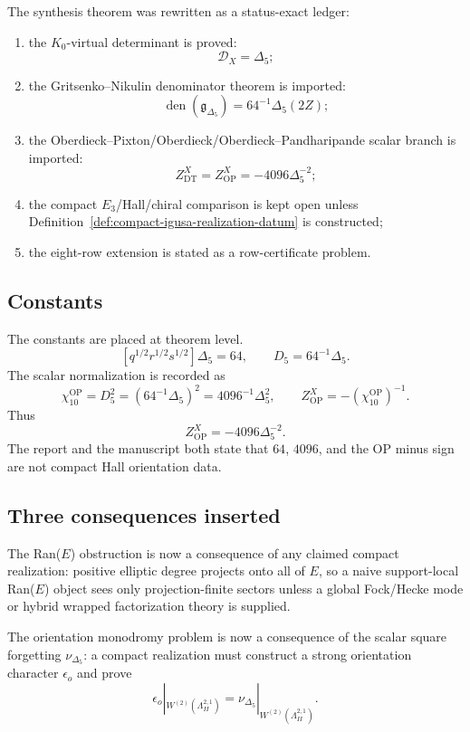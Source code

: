 The synthesis theorem was rewritten as a status-exact ledger:
\begin{enumerate}
\item the \(K_0\)-virtual determinant is proved:
\[
\mathcal D_X=\Delta_5;
\]
\item the Gritsenko--Nikulin denominator theorem is imported:
\[
\operatorname{den}(\mathfrak g_{\Delta_5})=64^{-1}\Delta_5(2Z);
\]
\item the Oberdieck--Pixton/Oberdieck/Oberdieck--Pandharipande scalar
branch is imported:
\[
Z^X_{\mathrm{DT}}=Z^X_{\mathrm{OP}}=-4096\Delta_5^{-2};
\]
\item the compact \(E_3\)/Hall/chiral comparison is kept open unless
Definition~\ref{def:compact-igusa-realization-datum} is constructed;
\item the eight-row extension is stated as a row-certificate problem.
\end{enumerate}

\subsection{Constants}

The constants are placed at theorem level.
\[
[q^{1/2}r^{1/2}s^{1/2}]\Delta_5=64,\qquad
D_5=64^{-1}\Delta_5.
\]
The scalar normalization is recorded as
\[
\chi_{10}^{\mathrm{OP}}=D_5^2
=(64^{-1}\Delta_5)^2
=4096^{-1}\Delta_5^2,
\qquad
Z^X_{\mathrm{OP}}=-(\chi_{10}^{\mathrm{OP}})^{-1}.
\]
Thus
\[
Z^X_{\mathrm{OP}}=-4096\Delta_5^{-2}.
\]
The report and the manuscript both state that \(64\), \(4096\), and the
OP minus sign are not compact Hall orientation data.

\subsection{Three consequences inserted}

The Ran(\(E\)) obstruction is now a consequence of any claimed compact
realization: positive elliptic degree projects onto all of \(E\), so a
naive support-local Ran(\(E\)) object sees only projection-finite
sectors unless a global Fock/Hecke mode or hybrid wrapped factorization
theory is supplied.

The orientation monodromy problem is now a consequence of the scalar
square forgetting \(\nu_{\Delta_5}\): a compact realization must
construct a strong orientation character \(\epsilon_o\) and prove
\[
\epsilon_o|_{W^{(2)}(\Lambda^{2,1}_{II})}
=\nu_{\Delta_5}|_{W^{(2)}(\Lambda^{2,1}_{II})}.
\]

